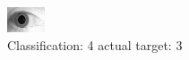 \begin{figure}[h!]
\begin{center}
\includegraphics[width=0.60\columnwidth]{figures/ID1870_class_4_target_3.png}
\end{center}
\caption{ Classification: 4 actual target: 3}
\label{fig:ID1870_class_4_target_3}
\end{figure}
